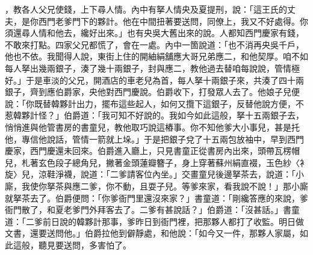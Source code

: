 ，教各人父兄使錢，上下尋人情。內中有拏人情央及夏提刑，說：「這王氏的丈夫，是你西門老爹門下的夥計。他在中間扭著要送問，同僚上，我又不好處得。你須還尋人情和他去，纔好出來。」也有央吳大舊出來的說。人都知西門慶家有錢，不敢來打點。四家父兄都慌了，會在一處。內中一箇說道：「也不消再央吳千戶，他也不依。我聞得人說，東街上住的開紬絹舖應大哥兄弟應二，和他契厚。咱不如每人拏出幾兩銀子，湊了幾十兩銀子，封與應二，教他過去替咱每說說，管情極好。」于是車淡的父兄，開酒店的車老兒為首，每人拏十兩銀子來，共湊了四十兩銀子，齊到應伯爵家，央他對西門慶說。伯爵收下，打發眾人去了。他娘子兒便說：「你既替韓夥計出力，擺布這些起人，如何又攬下這銀子，反替他說方便，不惹韓夥計怪？」伯爵道：「我可知不好說的。我如今如此這般，拏十五兩銀子去，悄悄進與他管書房的書童兒，教他取巧說這樁事。你不知他爹大小事兒，甚是托他，專信他說話，管情一箭就上垛。」于是把銀子兌了十五兩包放袖中，早到西門慶家，西門慶還未回來。伯爵進入廳上，只見書童正從書房內出來，頭帶瓦楞帽兒，札著玄色段子總角兒，撇著金頭蓮瓣簪子，身上穿著蘇州絹直裰，玉色紗〈衤旋〉兒，涼鞋淨襪，說道：「二爹請客位內坐。」交畫童兒後邊拏茶去，說道：「小廝，我使你拏茶與應二爹，你不動，且耍子兒。等爹來家，看我說不說！」那小廝就拏茶去了。伯爵便問：「你爹衙門里還沒來家？」書童道：「剛纔答應的來說，爹衙門散了，和夏老爹門外拜客去了。二爹有甚說話？」伯爵道：「沒甚話。」書童道：「二爹前日說的韓夥計那事，爹昨日到衙門裡，把那夥人都打了收監。明日做文書，還要送問他。」伯爵拉他到僻靜處，和他說：「如今又一件，那夥人家屬，如此這般，聽見要送問，多害怕了。

